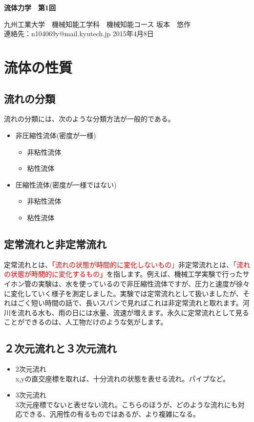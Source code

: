 \documentclass[a4j,twoside,openright,11pt]{jarticle}
\begin{document}
\begin{screen}
\huge
\begin{center}
{\bf 流体力学　第1回}\\
\end{center}

\normalsize
\begin{flushright}
九州工業大学　機械知能工学科　機械知能コース  坂本　悠作\\連絡先：n104069y@mail.kyutech.jp \hspace{0.2in} 2015年4月8日
\end{flushright}
\end{screen}

\section{流体の性質}
\subsection{流れの分類}
流れの分類には、次のような分類方法が一般的である。
\begin{itemize}
\item 非圧縮性流体(密度が一様)
\begin{itemize}
\item 非粘性流体
\item 粘性流体
\end{itemize}

\item 圧縮性流体(密度が一様ではない)
\begin{itemize}
\item 非粘性流体
\item 粘性流体
\end{itemize}
\end{itemize}
\subsection{定常流れと非定常流れ}
定常流れとは、\textcolor{red}{「流れの状態が時間的に変化しないもの」}非定常流れとは、\textcolor{red}{「流れの状態が時間的に変化するもの」}を指します。例えば、機械工学実験で行ったサイホン管の実験は、水を使っているので非圧縮性流体ですが、圧力と速度が徐々に変化していく様子を測定しました。実験では定常流れとして扱いましたが、それはごく短い時間の話で、長いスパンで見ればこれは非定常流れと取れます。河川を流れる水も、雨の日には水量、流速が増えます。永久に定常流れとして見ることができるのは、人工物だけのような気がします。
\subsection{２次元流れと３次元流れ}
\begin{itemize}
\item 2次元流れ\\
x,yの直交座標を取れば、十分流れの状態を表せる流れ。パイプなど。
\item 3次元流れ\\
3次元座標でないと表せない流れ。こちらのほうが、どのような流れにも対応できる、汎用性の有るものではあるが、より複雑になる。
\end{itemize}
\end{document}
